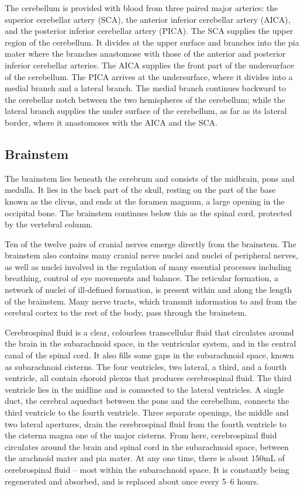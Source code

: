 \documentclass[]{book}
\begin{document}
The cerebellum is provided with blood from three paired major arteries: the superior cerebellar artery (SCA), the anterior inferior cerebellar artery (AICA), and the posterior inferior cerebellar artery (PICA). The SCA supplies the upper region of the cerebellum. It divides at the upper surface and branches into the pia mater where the branches anastomose with those of the anterior and posterior inferior cerebellar arteries. The AICA supplies the front part of the undersurface of the cerebellum. The PICA arrives at the undersurface, where it divides into a medial branch and a lateral branch. The medial branch continues backward to the cerebellar notch between the two hemispheres of the cerebellum; while the lateral branch supplies the under surface of the cerebellum, as far as its lateral border, where it anastomoses with the AICA and the SCA.

\hypertarget{brainstem}{%
\subsection{Brainstem}\label{brainstem}}

The brainstem lies beneath the cerebrum and consists of the midbrain, pons and medulla. It lies in the back part of the skull, resting on the part of the base known as the clivus, and ends at the foramen magnum, a large opening in the occipital bone. The brainstem continues below this as the spinal cord, protected by the vertebral column.

Ten of the twelve pairs of cranial nerves emerge directly from the brainstem. The brainstem also contains many cranial nerve nuclei and nuclei of peripheral nerves, as well as nuclei involved in the regulation of many essential processes including breathing, control of eye movements and balance. The reticular formation, a network of nuclei of ill-defined formation, is present within and along the length of the brainstem. Many nerve tracts, which transmit information to and from the cerebral cortex to the rest of the body, pass through the brainstem.

Cerebrospinal fluid is a clear, colourless transcellular fluid that circulates around the brain in the subarachnoid space, in the ventricular system, and in the central canal of the spinal cord. It also fills some gaps in the subarachnoid space, known as subarachnoid cisterns. The four ventricles, two lateral, a third, and a fourth ventricle, all contain choroid plexus that produces cerebrospinal fluid. The third ventricle lies in the midline and is connected to the lateral ventricles. A single duct, the cerebral aqueduct between the pons and the cerebellum, connects the third ventricle to the fourth ventricle. Three separate openings, the middle and two lateral apertures, drain the cerebrospinal fluid from the fourth ventricle to the cisterna magna one of the major cisterns. From here, cerebrospinal fluid circulates around the brain and spinal cord in the subarachnoid space, between the arachnoid mater and pia mater. At any one time, there is about 150mL of cerebrospinal fluid -- most within the subarachnoid space. It is constantly being regenerated and absorbed, and is replaced about once every 5--6 hours.
\end{document}
